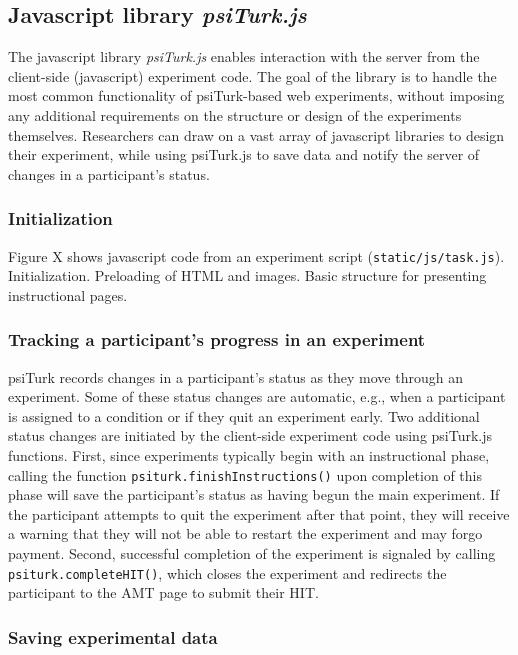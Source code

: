 \documentclass[twocolumn]{svjour3}          %
\begin{document}
\subsection{Javascript library \emph{psiTurk.js}}

The javascript library \emph{psiTurk.js} enables interaction with the server from the client-side (javascript) experiment code.
The goal of the library is to handle the most common functionality of psiTurk-based web experiments, without imposing any additional requirements on the structure or design of the experiments themselves.
Researchers can draw on a vast array of javascript libraries to design their experiment, while using psiTurk.js to save data and notify the server of changes in a participant's status.

\subsubsection{Initialization}

Figure X shows javascript code from an experiment script (\texttt{static/js/task.js}). 
Initialization. 
Preloading of HTML and images.
Basic structure for presenting instructional pages.

\subsubsection{Tracking a participant's progress in an experiment} 

psiTurk records changes in a participant's status as they move through an experiment. 
Some of these status changes are automatic, e.g., when a participant is assigned to a condition or if they quit an experiment early. 
Two additional status changes are initiated by the client-side experiment code using psiTurk.js functions.
First, since experiments typically begin with an instructional phase, calling the function \texttt{psiturk.finishInstructions()} upon completion of this phase will save the participant's status as having begun the main experiment.
If the participant attempts to quit the experiment after that point, they will receive a warning that they will not be able to restart the experiment and may forgo payment.
Second, successful completion of the experiment is signaled by calling \texttt{psiturk.completeHIT()}, which closes the experiment and redirects the participant to the AMT page to submit their HIT.

\subsubsection{Saving experimental data} 
\end{document}
